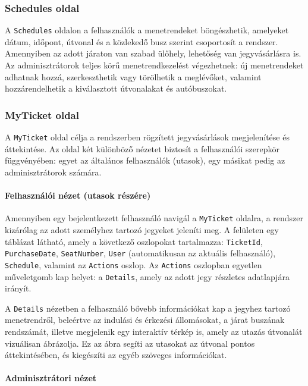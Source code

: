 \subsubsection{Schedules oldal}

A \texttt{Schedules} oldalon a felhasználók a menetrendeket böngészhetik, amelyeket dátum, időpont, útvonal és a közlekedő busz szerint csoportosít a rendszer. Amennyiben az adott járaton van szabad ülőhely, lehetőség van jegyvásárlásra is. Az adminisztrátorok teljes körű menetrendkezelést végezhetnek: új menetrendeket adhatnak hozzá, szerkeszthetik vagy törölhetik a meglévőket, valamint hozzárendelhetik a kiválasztott útvonalakat és autóbuszokat.

\subsubsection{MyTicket oldal}

A \texttt{MyTicket} oldal célja a rendszerben rögzített jegyvásárlások megjelenítése és áttekintése. Az oldal két különböző nézetet biztosít a felhasználói szerepkör függvényében: egyet az általános felhasználók (utasok), egy másikat pedig az adminisztrátorok számára. 

\paragraph{Felhasználói nézet (utasok részére)}

Amennyiben egy bejelentkezett felhasználó navigál a \texttt{MyTicket} oldalra, a rendszer kizárólag az adott személyhez tartozó jegyeket jeleníti meg. A felületen egy táblázat látható, amely a következő oszlopokat tartalmazza: \texttt{TicketId}, \texttt{PurchaseDate}, \texttt{SeatNumber}, \texttt{User} (automatikusan az aktuális felhasználó), \texttt{Schedule}, valamint az \texttt{Actions} oszlop. Az \texttt{Actions} oszlopban egyetlen műveletgomb kap helyet: a \texttt{Details}, amely az adott jegy részletes adatlapjára irányít.

A \texttt{Details} nézetben a felhasználó bővebb információkat kap a jegyhez tartozó menetrendről, beleértve az indulási és érkezési állomásokat, a járat buszának rendszámát, illetve megjelenik egy interaktív térkép is, amely az utazás útvonalát vizuálisan ábrázolja. Ez az ábra segíti az utasokat az útvonal pontos áttekintésében, és kiegészíti az egyéb szöveges információkat.

\paragraph{Adminisztrátori nézet}

